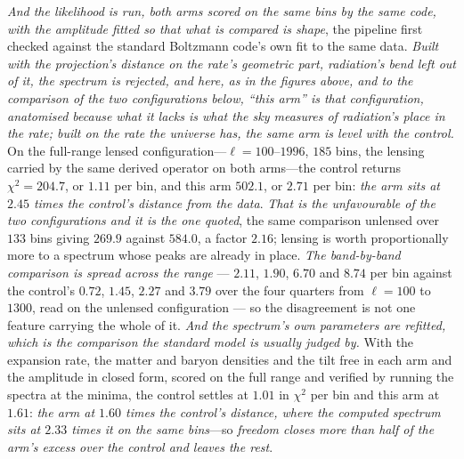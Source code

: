 \documentclass[11pt,a4paper]{article}
\theoremstyle{plain}
\theoremstyle{definition}
\theoremstyle{remark}
\begin{document}
\emph{And the likelihood is run, both arms scored on the same bins by the same code, with the amplitude
fitted so that what is compared is shape}, the pipeline first checked against the standard Boltzmann code's own fit to the same data. \emph{Built with the projection's distance on the rate's geometric part, radiation's bend left out of it,
the spectrum is rejected, and here, as in the figures above, and to the comparison of the two configurations below, ``this arm'' is
that configuration, anatomised because what it lacks is what the sky measures of radiation's place in the
rate; built on the rate the universe has, the same arm is level with the control.} On the full-range lensed configuration---$\ell=100$--$1996$, $185$ bins, the lensing carried
by the same derived operator on both arms---the control returns $\chi^{2}=204.7$, or $1.11$ per bin, and this
arm $502.1$, or $2.71$ per bin: \emph{the arm sits at $2.45$ times the control's distance from the
data}. \emph{That is the unfavourable of the two configurations and it is
the one quoted}, the same comparison unlensed over $133$ bins giving $269.9$ against $584.0$, a factor $2.16$;
lensing is worth proportionally more to a spectrum whose peaks are already in place. \emph{The band-by-band comparison is spread across the range} --- $2.11$, $1.90$, $6.70$ and $8.74$ per bin against the control's $0.72$, $1.45$, $2.27$ and $3.79$ over the four quarters from $\ell=100$ to $1300$, read on the unlensed configuration --- so the disagreement is not one feature carrying the whole of it. \emph{And the spectrum's own parameters are refitted, which is the comparison the standard model is usually
judged by.} With the expansion rate, the matter and baryon densities and the tilt free in each arm and the
amplitude in closed form, scored on the full range and verified by running the spectra at the minima, the
control settles at $1.01$ in $\chi^{2}$ per bin and this arm at $1.61$: \emph{the arm at $1.60$ times the
control's distance, where the computed spectrum sits at $2.33$ times it on the same bins}---so \emph{freedom closes
more than half of the arm's excess over the control and leaves the rest}.
\end{document}
